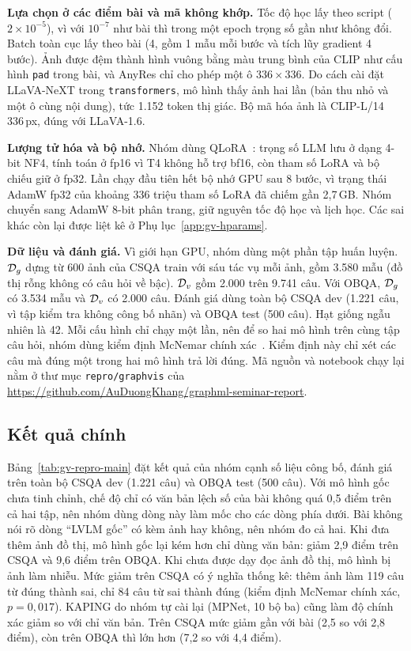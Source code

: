 \textbf{Lựa chọn ở các điểm bài và mã không khớp.} Tốc độ học lấy theo script ($2\times10^{-5}$), vì với $10^{-7}$ như bài thì trong một epoch trọng số gần như không đổi. Batch toàn cục lấy theo bài (4, gồm 1 mẫu mỗi bước và tích lũy gradient 4 bước). Ảnh được đệm thành hình vuông bằng màu trung bình của CLIP như cấu hình \texttt{pad} trong bài, và AnyRes chỉ cho phép một ô $336\times336$. Do cách cài đặt LLaVA-NeXT trong \texttt{transformers}, mô hình thấy ảnh hai lần (bản thu nhỏ và một ô cùng nội dung), tức 1.152 token thị giác. Bộ mã hóa ảnh là CLIP-L/14 336\,px, đúng với LLaVA-1.6.

\textbf{Lượng tử hóa và bộ nhớ.} Nhóm dùng QLoRA~\cite{dettmers2023qlora}: trọng số LLM lưu ở dạng 4-bit NF4, tính toán ở fp16 vì T4 không hỗ trợ bf16, còn tham số LoRA và bộ chiếu giữ ở fp32. Lần chạy đầu tiên hết bộ nhớ GPU sau 8 bước, vì trạng thái AdamW fp32 của khoảng 336 triệu tham số LoRA đã chiếm gần 2,7\,GB. Nhóm chuyển sang AdamW 8-bit phân trang, giữ nguyên tốc độ học và lịch học. Các sai khác còn lại được liệt kê ở Phụ lục~\ref{app:gv-hparams}.

\textbf{Dữ liệu và đánh giá.} Vì giới hạn GPU, nhóm dùng một phần tập huấn luyện. $\mathcal{D}_g$ dựng từ 600 ảnh của CSQA train với sáu tác vụ mỗi ảnh, gồm 3.580 mẫu (đồ thị rỗng không có câu hỏi về bậc). $\mathcal{D}_v$ gồm 2.000 trên 9.741 câu. Với OBQA, $\mathcal{D}_g$ có 3.534 mẫu và $\mathcal{D}_v$ có 2.000 câu. Đánh giá dùng toàn bộ CSQA dev (1.221 câu, vì tập kiểm tra không công bố nhãn) và OBQA test (500 câu). Hạt giống ngẫu nhiên là 42. Mỗi cấu hình chỉ chạy một lần, nên để so hai mô hình trên cùng tập câu hỏi, nhóm dùng kiểm định McNemar chính xác~\cite{mcnemar1947}. Kiểm định này chỉ xét các câu mà đúng một trong hai mô hình trả lời đúng. Mã nguồn và notebook chạy lại nằm ở thư mục \texttt{repro/graphvis} của \url{https://github.com/AuDuongKhang/graphml-seminar-report}.

\subsection{Kết quả chính}
Bảng~\ref{tab:gv-repro-main} đặt kết quả của nhóm cạnh số liệu công bố, đánh giá trên toàn bộ CSQA dev (1.221 câu) và OBQA test (500 câu). Với mô hình gốc chưa tinh chỉnh, chế độ chỉ có văn bản lệch số của bài không quá 0,5 điểm trên cả hai tập, nên nhóm dùng dòng này làm mốc cho các dòng phía dưới. Bài không nói rõ dòng ``LVLM gốc'' có kèm ảnh hay không, nên nhóm đo cả hai. Khi đưa thêm ảnh đồ thị, mô hình gốc lại kém hơn chỉ dùng văn bản: giảm 2,9 điểm trên CSQA và 9,6 điểm trên OBQA. Khi chưa được dạy đọc ảnh đồ thị, mô hình bị ảnh làm nhiễu. Mức giảm trên CSQA có ý nghĩa thống kê: thêm ảnh làm 119 câu từ đúng thành sai, chỉ 84 câu từ sai thành đúng (kiểm định McNemar chính xác, $p=0{,}017$). KAPING do nhóm tự cài lại (MPNet, 10 bộ ba) cũng làm độ chính xác giảm so với chỉ văn bản. Trên CSQA mức giảm gần với bài (2,5 so với 2,8 điểm), còn trên OBQA thì lớn hơn (7,2 so với 4,4 điểm).

